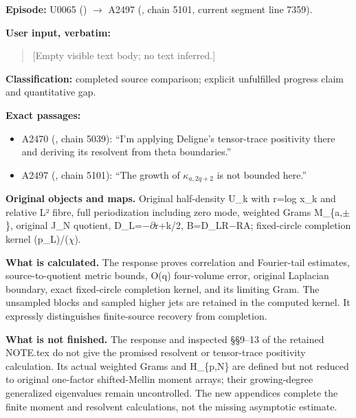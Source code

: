 \textbf{Episode:} U0065
(\protect{})
\allowbreak{}\ensuremath{→}\allowbreak{} A2497
(\protect{}, chain 5101,
current segment line 7359).

\textbf{User input, verbatim:}

\begin{quote}
{[}Empty visible text body; no text inferred.{]}
\end{quote}

\textbf{Classification:} completed source comparison; explicit
unfulfilled progress claim and quantitative gap.

\textbf{Exact passages:}

\begin{itemize}
\tightlist
\item
  A2470 (\protect{}, chain
  5039): ``I'm applying Deligne's tensor-trace positivity there and
  deriving its resolvent from theta boundaries.''
\item
  A2497 (\protect{}, chain
  5101): ``The growth of \(\kappa_{a,2q+2}\) is not bounded here.''
\end{itemize}

\textbf{Original objects and maps.} Original half-density U\_k with
r=log x\_k and relative L² fibre, full periodization including zero
mode, weighted Grams M\_\{a,\allowbreak{}\ensuremath{±}\allowbreak{}\},
original J\_N quotient,
D\_L=\allowbreak{}\ensuremath{−}\allowbreak{}\allowbreak{}\ensuremath{∂}\allowbreak{}r+k/2,
B=D\_LR\allowbreak{}\ensuremath{−}\allowbreak{}RA; fixed-circle
completion kernel (p\_L)/(\allowbreak{}\ensuremath{χ}\allowbreak{}).

\textbf{What is calculated.} The response proves correlation and
Fourier-tail estimates, source-to-quotient metric bounds, O(q)
four-volume error, original Laplacian boundary, exact fixed-circle
completion kernel, and its limiting Gram. The unsampled blocks and
sampled higher jets are retained in the computed kernel. It expressly
distinguishes finite-source recovery from completion.

\textbf{What is not finished.} The response and inspected §§9--13 of the
retained NOTE.tex do not give the promised resolvent or tensor-trace
positivity calculation. Its actual weighted Grams and H\_\{p,N\} are
defined but not reduced to original one-factor shifted-Mellin moment
arrays; their growing-degree generalized eigenvalues remain
uncontrolled. The new appendices complete the finite moment and
resolvent calculations, not the missing asymptotic estimate.

